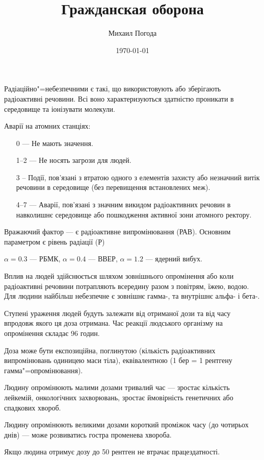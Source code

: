 \documentclass[a4paper,10pt,notitlepage,pdftex,headsepline]{scrartcl}
\author{Михаил Погода}
\title{Гражданская оборона}
\date{\today}
\begin{document}
  \maketitle

  Радіаційно"=небезпечними є такі, що використовують або зберігають
  радіоактивні речовини.
  Всі воно характеризуються здатністю проникати в середовище та іонізувати
  молекули.

  Аварії на атомних станціях:
  \begin{itemize}
    \item[0] --- Не мають значення.
    \item[1--2] --- Не носять загрози для людей.
    \item[3] -- Події, пов’язані з втратою одного з елементів захисту або
      незначний витік речовини в середовище (без перевищення встановлених
      меж).
    \item[4--7] --- Аварії, пов’язані з значним викидом радіоактивних речовин в
      навколишнє середовище або пошкодження активної зони атомного ректору.
  \end{itemize}

  Вражаючий фактор --- є радіоактивне випромінювання (РАВ).
  Основним параметром є рівень радіації (Р)

  $\alpha = 0.3$ --- РБМК, $\alpha = 0.4$ --- ВВЕР, $\alpha = 1.2$ --- ядерний
  вибух.

  Вплив на людей здійснюється шляхом зовнішнього опромінення або коли
  радіоактивні речовини потрапляють всередину разом з повітрям, їжею, водою.
  Для людини найбільш небезпечне є зовнішнє гамма-, та внутрішнє альфа- і
  бета-.

  Ступені ураження людей будуть залежати від отриманої дози та від часу
  впродовж якого ця доза отримана.
  Час реакції людського організму на опромінення складає 96 годин.

  Доза може бути експозиційна, поглинутою (кількість радіоактивних
  випромінювань одиницею маси тіла), еквівалентною (1 бер = 1 рентгену
  гамма"=опромінювання).

  Людину опромінюють малими дозами тривалий час --- зростає кількість лейкемій,
  онкологічних захворювань, зростає ймовірність генетичних або спадкових
  хвороб.

  Людину опромінюють великими дозами короткий проміжок часу (до чотирьох днів)
  --- може розвиватись гостра променева хвороба.

  Якщо людина отримує дозу до 50 рентген не втрачає працездатності.
\end{document}
